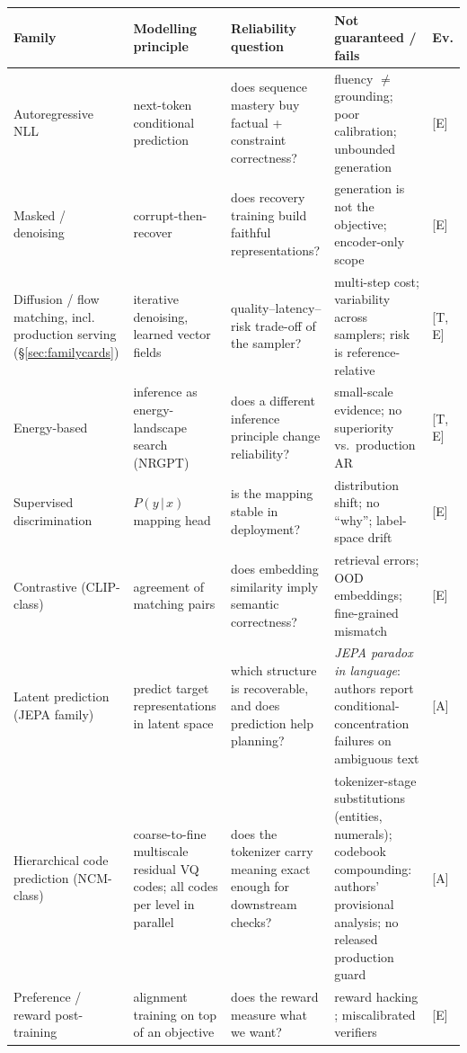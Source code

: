 \documentclass[11pt]{article}
\begin{document}
\begin{table}[!t]
\centering
\small
\begin{tabular}{@{}p{2.5cm}p{3.2cm}p{3.6cm}p{4.2cm}p{0.9cm}@{}}
\toprule
Family & Modelling principle & Reliability question & Not guaranteed / fails & Ev. \\
\midrule
Autoregressive NLL & next-token conditional prediction & does sequence mastery buy factual + constraint correctness? & fluency $\ne$ grounding; poor calibration; unbounded generation & {[E]} \\
Masked / denoising & corrupt-then-recover & does recovery training build faithful representations? & generation is not the objective; encoder-only scope & {[E]} \\
Diffusion / flow matching, incl. production serving (\S\ref{sec:familycards}) & iterative denoising, learned vector fields & quality--latency--risk trade-off of the sampler? & multi-step cost; variability across samplers; risk is reference-relative & {[T, E]} \\
Energy-based & inference as energy-landscape search (NRGPT) & does a different inference principle change reliability? & small-scale evidence; no superiority vs.\ production AR & {[T, E]} \\
Supervised discrimination & $P(y\,|\,x)$ mapping head & is the mapping stable in deployment? & distribution shift; no ``why''; label-space drift & {[E]} \\
Contrastive (CLIP-class) \cite{radford2021clip} & agreement of matching pairs & does embedding similarity imply semantic correctness? & retrieval errors; OOD embeddings; fine-grained mismatch & {[E]} \\
Latent prediction (JEPA family) & predict target representations in latent space & which structure is recoverable, and does prediction help planning? & \emph{JEPA paradox in language}: authors report conditional-concentration failures on ambiguous text & {[A]} \\
Hierarchical code prediction (NCM-class) & coarse-to-fine multiscale residual VQ codes; all codes per level in parallel & does the tokenizer carry meaning exact enough for downstream checks? & tokenizer-stage substitutions (entities, numerals); codebook compounding: authors' provisional analysis; no released production guard & {[A]} \\
Preference / reward post-training & alignment training on top of an objective & does the reward measure what we want? & reward hacking \cite{gao2022overoptimization}; miscalibrated verifiers \cite{id260601066} & {[E]} \\

\end{tabular}
\end{table}
\end{document}
